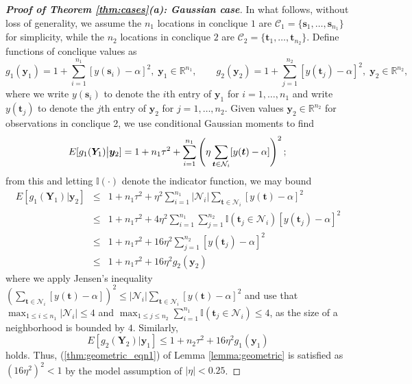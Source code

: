 \documentclass[12pt]{article}
\theoremstyle{definition}
\begin{document}
\begin{proof}[\bf Proof of Theorem \ref{thm:cases}(a): Gaussian case]
In what follows, without loss of generality, we assume the $n_1$ locations in conclique $1$ are $\mathcal{C}_1 = \{\boldsymbol s_1, \dots, \boldsymbol  s_{n_1}\}$ for simplicity, while the $n_2$ locations in conclique $2$ are $\mathcal{C}_2 = \{\boldsymbol t_1  , \dots, \boldsymbol t_{n_2}\}$. 
Define functions of conclique values as
\[
g_{1}(\boldsymbol y_1) = 
1+\sum_{i=1}^{n_1}   [y(\boldsymbol s_i )-\alpha]^2,  \;\boldsymbol y_1 \in \mathbb{R}^{n_1},  \qquad
  g_{2}(\boldsymbol y_2) = 1+ \sum_{j=1}^{n_2}[y(\boldsymbol t_j )-\alpha]^2, \;\boldsymbol y_2 \in \mathbb{R}^{n_2},  \]
  where we write $y(\boldsymbol s_i )$ to denote the $i$th entry of $\boldsymbol y_1$ for $i=1,\ldots,n_1$ and write $y(\boldsymbol t_j )$ to denote the $j$th entry of $\boldsymbol y_2$ for $j=1,\ldots,n_2$.  
Given values    $\boldsymbol y_2 \in \mathbb{R}^{n_2}$ for observations in conclique 2, we use conditional Gaussian moments to find
\[
 E  [g_1(\boldsymbol Y_1) \big| \boldsymbol y_2 ]
     =  1+ n_1 \tau^2  +    \sum_{i=1}^{n_1} \left(\eta \sum_{ \boldsymbol t  \in \mathcal{N}_i }   [y(\boldsymbol t )-\alpha] \right)^2;  \\
\]
from this and letting $\mathbb{I}(\cdot)$ denote the indicator function, we may bound
    \begin{eqnarray*}
  E  [g_1(\boldsymbol Y_1) \big| \boldsymbol y_2 ] 
  & \leq  & 1+ n_1 \tau^2  +    \eta^2 \sum_{i=1}^{n_1} |\mathcal{N}_i|   \sum_{ \boldsymbol t  \in \mathcal{N}_i }   [y(\boldsymbol t  )-\alpha]^2\\
  & \leq  & 1+ n_1 \tau^2  +    4\eta^2 \sum_{i=1}^{n_1} \sum_{j=1}^{n_2}\mathbb{I}( \boldsymbol t_j \in \mathcal{N}_i)     [y(\boldsymbol t_j )-\alpha]^2\\
 & \leq  & 1+ n_1 \tau^2  +    16\eta^2 \sum_{j=1}^{n_2}  [y(\boldsymbol t_j )-\alpha]^2 \\
   & \leq  &   1+ n_1 \tau^2 +  16\eta^2 g_{2}(\boldsymbol y_2)
    \end{eqnarray*}
  where we apply Jensen's inequality $( \sum_{ \boldsymbol t  \in \mathcal{N}_i }   [y(\boldsymbol t )-\alpha]  )^2 \leq |\mathcal{N}_i |
  \sum_{ \boldsymbol t  \in \mathcal{N}_i }   [y(\boldsymbol t )-\alpha]^2$ and use that $ \max_{1 \leq i \leq n_1}| \mathcal{N}_i| \leq 4 $ 
  and $ \max_{1 \leq j \leq n_2} \sum_{i=1}^{n_1} \mathbb{I}( \boldsymbol t_j \in \mathcal{N}_i) \leq 4$, as the size of a neighborhood is bounded by $4$.
 Similarly,
\[
 E  [g_2(\boldsymbol Y_2) \big| \boldsymbol y_1 ]  \leq 
  1+ n_2 \tau^2 +  16\eta^2 g_{1}(\boldsymbol y_1)
\]
holds.  Thus, (\ref{thm:geometric_eqn1}) of Lemma \ref{lemma:geometric} is satisfied as $ (16\eta^2)^2 < 1$ by the model assumption of $|\eta| < 0.25$.

\end{proof}
\end{document}

